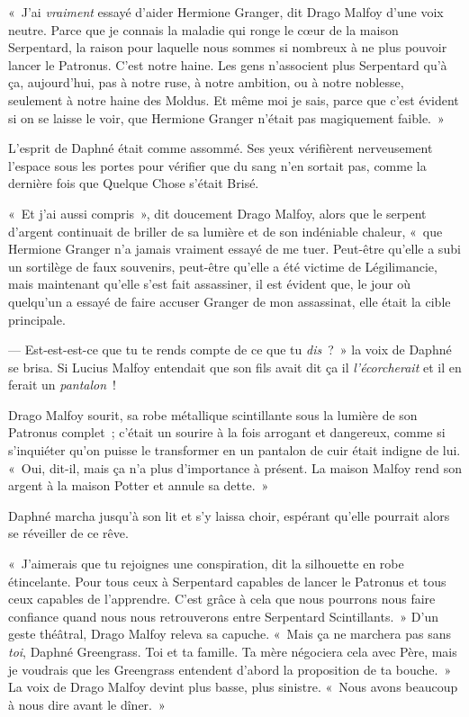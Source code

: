 «~J'ai \emph{vraiment} essayé d'aider Hermione Granger, dit Drago Malfoy d'une voix neutre. Parce que je connais la maladie qui ronge le cœur de la maison Serpentard, la raison pour laquelle nous sommes si nombreux à ne plus pouvoir lancer le Patronus. C'est notre haine. Les gens n'associent plus Serpentard qu'à ça, aujourd'hui, pas à notre ruse, à notre ambition, ou à notre noblesse, seulement à notre haine des Moldus. Et même moi je sais, parce que c'est évident si on se laisse le voir, que Hermione Granger n'était pas magiquement faible.~»

L'esprit de Daphné était comme assommé. Ses yeux vérifièrent nerveusement l'espace sous les portes pour vérifier que du sang n'en sortait pas, comme la dernière fois que Quelque Chose s'était Brisé.

«~Et j'ai aussi compris~», dit doucement Drago Malfoy, alors que le serpent d'argent continuait de briller de sa lumière et de son indéniable chaleur, «~que Hermione Granger n'a jamais vraiment essayé de me tuer. Peut-être qu'elle a subi un sortilège de faux souvenirs, peut-être qu'elle a été victime de Légilimancie, mais maintenant qu'elle s'est fait assassiner, il est évident que, le jour où quelqu'un a essayé de faire accuser Granger de mon assassinat, elle était la cible principale.

--- Est-est-est-ce que tu te rends compte de ce que tu \emph{dis}~?~» la voix de Daphné se brisa. Si Lucius Malfoy entendait que son fils avait dit ça il \emph{l'écorcherait} et il en ferait un \emph{pantalon}~!

Drago Malfoy sourit, sa robe métallique scintillante sous la lumière de son Patronus complet~; c'était un sourire à la fois arrogant et dangereux, comme si s'inquiéter qu'on puisse le transformer en un pantalon de cuir était indigne de lui. «~Oui, dit-il, mais ça n'a plus d'importance à présent. La maison Malfoy rend son argent à la maison Potter et annule sa dette.~»

Daphné marcha jusqu'à son lit et s'y laissa choir, espérant qu'elle pourrait alors se réveiller de ce rêve.

«~J'aimerais que tu rejoignes une conspiration, dit la silhouette en robe étincelante. Pour tous ceux à Serpentard capables de lancer le Patronus et tous ceux capables de l'apprendre. C'est grâce à cela que nous pourrons nous faire confiance quand nous nous retrouverons entre Serpentard Scintillants.~» D'un geste théâtral, Drago Malfoy releva sa capuche. «~Mais ça ne marchera pas sans \emph{toi}, Daphné Greengrass. Toi et ta famille. Ta mère négociera cela avec Père, mais je voudrais que les Greengrass entendent d'abord la proposition de ta bouche.~» La voix de Drago Malfoy devint plus basse, plus sinistre. «~Nous avons beaucoup à nous dire avant le dîner.~»

